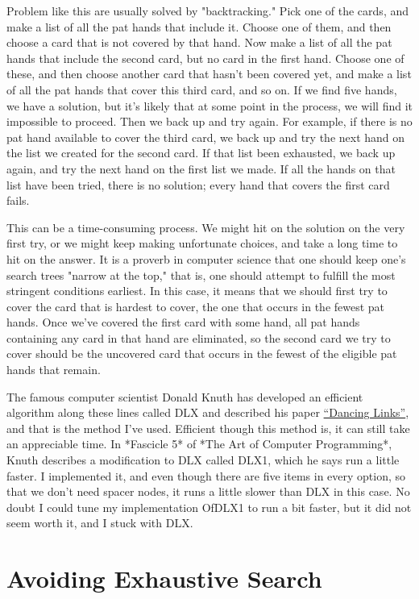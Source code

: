 \documentclass [12pt, letterpaper] {article}
\begin{document}
Problem like this are usually solved by "backtracking."  Pick one of the cards, and make a list of all the pat
hands that include it.  Choose one of them, and then choose a card that is not covered by that hand.  Now make a
list of all the pat hands that include the second card, but no card in the first hand.  Choose one of these,
and then choose another card that hasn't been covered yet, and make a list of all the pat hands that cover this third 
card, and so on.  If we find five hands, we have a solution, but it's likely that at some point in the process, we 
will find it impossible to proceed.  Then we back up and try again.  For example, if there is no pat hand available
to cover the third card, we back up and try the next hand on the list we created for the second card.  If that list
been exhausted, we back up again, and try the next hand on the first list we made.  If all the hands on that list have 
been tried, there is no solution; every hand that covers the first card fails.

This can be a time-consuming process.  We might hit on the solution on the very first try, or we might keep making unfortunate
choices, and take a long time to hit on the answer. It is a proverb in computer science that one should keep one's search trees
"narrow at the top," that is, one should attempt to fulfill the most stringent conditions earliest.  In this case, it means 
that we should first try to cover the card that is hardest to cover, the one that occurs in the fewest pat hands.  Once we've
covered the first card with some hand, all pat hands containing any card in that hand are eliminated, so the second card we 
try to cover should be the uncovered card that occurs in the fewest of the eligible pat hands that remain.

The famous computer scientist Donald Knuth has developed an efficient algorithm along these lines called DLX and described his paper  
\href{https://arxiv.org/abs/cs/0011047}{``Dancing Links''}, and that is the method I've used.  Efficient though this
method is, it can still take an appreciable time.  In *Fascicle 5* of *The Art of Computer Programming*, Knuth describes a modification
to DLX called DLX1, which he says run a little faster.  I implemented it, and even though there are five items in every option, 
so that we don't need spacer nodes, it runs a little slower than DLX in this case.  No doubt I could tune my implementation OfDLX1 
to run a bit faster, but it did not seem worth it, and I stuck with DLX.   

\section*{Avoiding Exhaustive Search}
\end{document}
